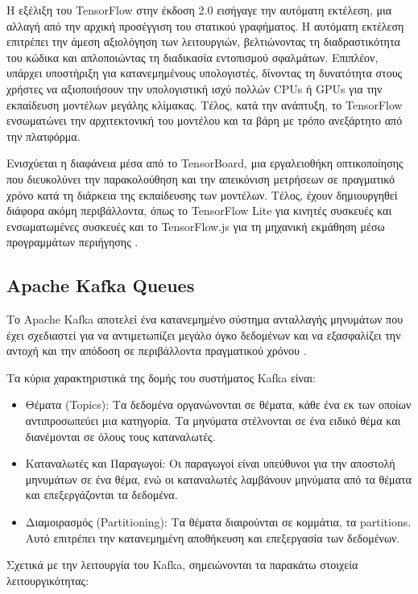 Η εξέλιξη του TensorFlow στην έκδοση 2.0 εισήγαγε την αυτόματη εκτέλεση, μια αλλαγή από την αρχική προσέγγιση του στατικού γραφήματος. Η αυτόματη εκτέλεση επιτρέπει την άμεση αξιολόγηση των λειτουργιών, βελτιώνοντας τη διαδραστικότητα του κώδικα και απλοποιώντας τη διαδικασία εντοπισμού σφαλμάτων. Επιπλέον, υπάρχει υποστήριξη για κατανεμημένους υπολογιστές, δίνοντας τη δυνατότητα στους χρήστες να αξιοποιήσουν την υπολογιστική ισχύ πολλών CPUs ή GPUs για την εκπαίδευση μοντέλων μεγάλης κλίμακας. Τέλος, κατά την ανάπτυξη, το TensorFlow ενσωματώνει την αρχιτεκτονική του μοντέλου και τα βάρη με τρόπο ανεξάρτητο από την πλατφόρμα. 

Ενισχύεται η διαφάνεια μέσα από το TensorBoard, μια εργαλειοθήκη οπτικοποίησης που διευκολύνει την παρακολούθηση και την απεικόνιση μετρήσεων σε πραγματικό χρόνο κατά τη διάρκεια της εκπαίδευσης των μοντέλων. Τέλος, έχουν δημιουργηθεί διάφορα ακόμη περιβάλλοντα, όπως το TensorFlow Lite για κινητές συσκευές και ενσωματωμένες συσκευές και το TensorFlow.js για τη μηχανική εκμάθηση μέσω προγραμμάτων περιήγησης \cite{tensorflow1}.
        
\subsection{Apache Kafka Queues}
\label{subsec:kafka}

Το Apache Kafka αποτελεί ένα κατανεμημένο σύστημα ανταλλαγής μηνυμάτων που έχει σχεδιαστεί για να αντιμετωπίζει μεγάλο όγκο δεδομένων και να εξασφαλίζει την αντοχή και την απόδοση σε περιβάλλοντα πραγματικού χρόνου \cite{kafka1}.

Τα κύρια χαρακτηριστικά της δομής του συστήματος Kafka είναι:

\begin{itemize}
\item Θέματα (Topics): Τα δεδομένα οργανώνονται σε θέματα, κάθε ένα εκ των οποίων αντιπροσωπεύει μια κατηγορία. Τα μηνύματα στέλνονται σε ένα ειδικό θέμα και διανέμονται σε όλους τους καταναλωτές.
\item Καταναλωτές και Παραγωγοί: Οι παραγωγοί είναι υπεύθυνοι για την αποστολή μηνυμάτων σε ένα θέμα, ενώ οι καταναλωτές λαμβάνουν μηνύματα από τα θέματα και επεξεργάζονται τα δεδομένα.
\item Διαμοιρασμός (Partitioning): Τα θέματα διαιρούνται σε κομμάτια, τα partitions. Αυτό επιτρέπει την κατανεμημένη αποθήκευση και επεξεργασία των δεδομένων.
\end{itemize}

Σχετικά με την λειτουργία του Kafka, σημειώνονται τα παρακάτω στοιχεία λειτουργικότητας:

